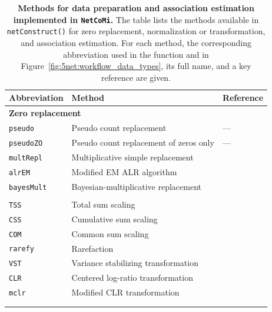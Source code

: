 \begin{table}[!htb]
\centering
\caption{\textbf{Methods for data preparation and association estimation implemented in \texttt{NetCoMi}.} The table lists the methods available in \texttt{netConstruct()} for zero replacement, normalization or transformation, and association estimation. For each method, the corresponding abbreviation used in the function and in Figure~\ref{fig:5net:workflow_data_types}, its full name, and a key reference are given.}
\label{tab:5net:workflow_methods}
\vspace{0.5em}
\small
\renewcommand{\arraystretch}{1}
\begin{tabularx}{\textwidth}{p{2cm} p{7.3cm} p{5.3cm}}
\toprule
Abbreviation & Method & Reference \\
\midrule
\multicolumn{3}{l}{\textbf{Zero replacement}} \\
\addlinespace[0.2em]
\texttt{pseudo} & Pseudo count replacement & --- \\
\texttt{pseudoZO} & Pseudo count replacement of zeros only & --- \\
\texttt{multRepl} & Multiplicative simple replacement & \citep{martin-fernandez2003dealing} \\
\texttt{alrEM} & Modified EM ALR algorithm & \citep{palarea-albaladejo2007parametric} \\
\texttt{bayesMult} & Bayesian-multiplicative replacement & \citep{martin-fernandez2015bayesianmultiplicative} \\
\addlinespace
\midrule
\multicolumn{3}{l}{\textbf{Normalization or transformation}} \\
\addlinespace[0.2em]
\texttt{TSS} & Total sum scaling & \citep{weiss2017normalization} \\
\texttt{CSS} & Cumulative sum scaling & \citep{paulson2013differential} \\
\texttt{COM} & Common sum scaling & \citep{weiss2017normalization} \\
\texttt{rarefy} & Rarefaction & \citep{hong2022rarefy} \\
\texttt{VST} & Variance stabilizing transformation & \citep{love2014moderated} \\
\texttt{CLR} & Centered log-ratio transformation & \citep{aitchison1986statistical} \\
\texttt{mclr} & Modified CLR transformation & \citep{yoon2020sparse} \\
\addlinespace
\midrule
\multicolumn{3}{l}{\textbf{Association estimation}} \\
\addlinespace[0.2em]

\end{tabularx}
\end{table}
